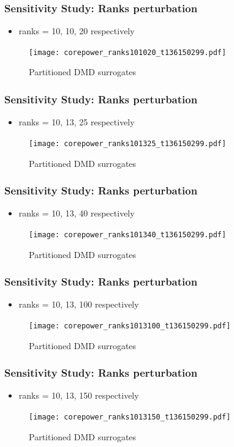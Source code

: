 \documentclass[fleqn]{beamer}
\begin{document}
\begin{frame}
\frametitle{Sensitivity Study: Ranks perturbation}
\begin{itemize}
 \item ranks = 10, 10, 20 respectively
\end{itemize}
\begin{figure}[ht]
\texttt{[image: corepower\_ranks101020\_t136150299.pdf]}
\caption{Partitioned DMD surrogates}
\end{figure}
\end{frame}

\begin{frame}
\frametitle{Sensitivity Study: Ranks perturbation}
\begin{itemize}
 \item ranks = 10, 13, 25 respectively
\end{itemize}
\begin{figure}[ht]
\texttt{[image: corepower\_ranks101325\_t136150299.pdf]}
\caption{Partitioned DMD surrogates}
\end{figure}
\end{frame}

\begin{frame}
\frametitle{Sensitivity Study: Ranks perturbation}
\begin{itemize}
 \item ranks = 10, 13, 40 respectively
\end{itemize}
\begin{figure}[ht]
\texttt{[image: corepower\_ranks101340\_t136150299.pdf]}
\caption{Partitioned DMD surrogates}
\end{figure}
\end{frame}

\begin{frame}
\frametitle{Sensitivity Study: Ranks perturbation}
\begin{itemize}
 \item ranks = 10, 13, 100 respectively
\end{itemize}
\begin{figure}[ht]
\texttt{[image: corepower\_ranks1013100\_t136150299.pdf]}
\caption{Partitioned DMD surrogates}
\end{figure}
\end{frame}

\begin{frame}
\frametitle{Sensitivity Study: Ranks perturbation}
\begin{itemize}
 \item ranks = 10, 13, 150 respectively
\end{itemize}
\begin{figure}[ht]
\texttt{[image: corepower\_ranks1013150\_t136150299.pdf]}
\caption{Partitioned DMD surrogates}
\end{figure}
\end{frame}
\end{document}
